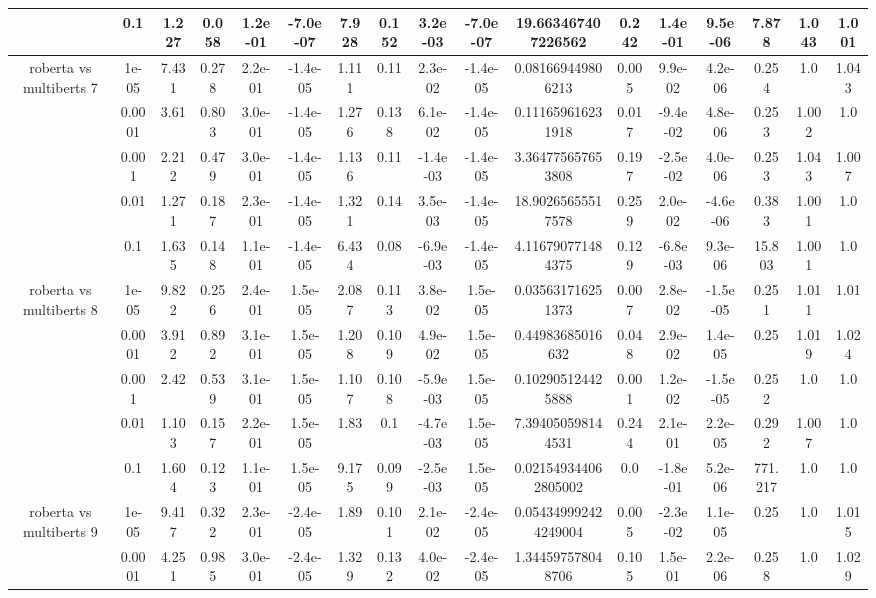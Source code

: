 \begin{tabular}{|c|c|c|c|c|c|c|c|c|c|c|c|c|c|c|c|c|}
 & 0.1 & 1.227 & 0.058 & 1.2e-01 & -7.0e-07 & 7.928 & 0.152 & 3.2e-03 & -7.0e-07 & 19.663467407226562 & 0.242 & 1.4e-01 & 9.5e-06 & 7.878 & 1.043 & 1.001 \\
\hline
\multirow{5}{*}{roberta  vs multiberts 7} & 1e-05 & 7.431 & 0.278 & 2.2e-01 & -1.4e-05 & 1.111 & 0.11 & 2.3e-02 & -1.4e-05 & 0.081669449806213 & 0.005 & 9.9e-02 & 4.2e-06 & 0.254 & 1.0 & 1.043 \\
 & 0.0001 & 3.61 & 0.803 & 3.0e-01 & -1.4e-05 & 1.276 & 0.138 & 6.1e-02 & -1.4e-05 & 0.111659616231918 & 0.017 & -9.4e-02 & 4.8e-06 & 0.253 & 1.002 & 1.0 \\
 & 0.001 & 2.212 & 0.479 & 3.0e-01 & -1.4e-05 & 1.136 & 0.11 & -1.4e-03 & -1.4e-05 & 3.364775657653808 & 0.197 & -2.5e-02 & 4.0e-06 & 0.253 & 1.043 & 1.007 \\
 & 0.01 & 1.271 & 0.187 & 2.3e-01 & -1.4e-05 & 1.321 & 0.14 & 3.5e-03 & -1.4e-05 & 18.90265655517578 & 0.259 & 2.0e-02 & -4.6e-06 & 0.383 & 1.001 & 1.0 \\
 & 0.1 & 1.635 & 0.148 & 1.1e-01 & -1.4e-05 & 6.434 & 0.08 & -6.9e-03 & -1.4e-05 & 4.116790771484375 & 0.129 & -6.8e-03 & 9.3e-06 & 15.803 & 1.001 & 1.0 \\
\hline
\multirow{5}{*}{roberta  vs multiberts 8} & 1e-05 & 9.822 & 0.256 & 2.4e-01 & 1.5e-05 & 2.087 & 0.113 & 3.8e-02 & 1.5e-05 & 0.035631716251373 & 0.007 & 2.8e-02 & -1.5e-05 & 0.251 & 1.011 & 1.01 \\
 & 0.0001 & 3.912 & 0.892 & 3.1e-01 & 1.5e-05 & 1.208 & 0.109 & 4.9e-02 & 1.5e-05 & 0.44983685016632 & 0.048 & 2.9e-02 & 1.4e-05 & 0.25 & 1.019 & 1.024 \\
 & 0.001 & 2.42 & 0.539 & 3.1e-01 & 1.5e-05 & 1.107 & 0.108 & -5.9e-03 & 1.5e-05 & 0.102905124425888 & 0.001 & 1.2e-02 & -1.5e-05 & 0.252 & 1.0 & 1.0 \\
 & 0.01 & 1.103 & 0.157 & 2.2e-01 & 1.5e-05 & 1.83 & 0.1 & -4.7e-03 & 1.5e-05 & 7.394050598144531 & 0.244 & 2.1e-01 & 2.2e-05 & 0.292 & 1.007 & 1.0 \\
 & 0.1 & 1.604 & 0.123 & 1.1e-01 & 1.5e-05 & 9.175 & 0.099 & -2.5e-03 & 1.5e-05 & 0.021549344062805002 & 0.0 & -1.8e-01 & 5.2e-06 & 771.217 & 1.0 & 1.0 \\
\hline
\multirow{5}{*}{roberta  vs multiberts 9} & 1e-05 & 9.417 & 0.322 & 2.3e-01 & -2.4e-05 & 1.89 & 0.101 & 2.1e-02 & -2.4e-05 & 0.054349992424249004 & 0.005 & -2.3e-02 & 1.1e-05 & 0.25 & 1.0 & 1.015 \\
 & 0.0001 & 4.251 & 0.985 & 3.0e-01 & -2.4e-05 & 1.329 & 0.132 & 4.0e-02 & -2.4e-05 & 1.344597578048706 & 0.105 & 1.5e-01 & 2.2e-06 & 0.258 & 1.0 & 1.029 \\

\end{tabular}
